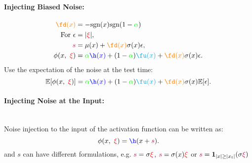 \documentclass[potrait,a0paper,fontscale=0.285,final]{baposter} %
\newcommand{\tpurple}[1]{\textcolor{purple}{#1}}
\newcommand{\tblue}[1]{\textcolor{blue}{#1}}
\newcommand{\tgreen}[1]{\textcolor{green}{#1}}
\newcommand{\torange}[1]{\textcolor{orange}{#1}}
\newcommand{\tcyan}[1]{\textcolor{cyan}{#1}}
\begin{document}
\begin{poster}
{\begin{minipage}[b]{0.92\textwidth}
	\begin{center}
		\centerline{}
	\end{center}
    \vspace*{-4mm}
\end{minipage}


\paragraph{Injecting Biased Noise:}
\begin{align*}
\torange{\fd(x)}&=-\text{sgn}(x)\text{sgn}(1-\tgreen{\alpha})\\
\text{For}~\epsilon&=|\tred{\xi}|, \\
    \tpurple{s}&=\mu(x) + \torange{\fd(x)} \sigma(x) \epsilon, \\
    \phi(x,~\tred{\xi})&=\tgreen{\alpha}\tblue{\h(x)} + (1-\tgreen{\alpha})\tcyan{\fu(x)} +
    \torange{\fd(x)}\sigma(x)\epsilon.
\end{align*}
Use the expectation of the noise at the test time:
\begin{equation*}
\E[\phi(x,~\tred{\xi})]=\tgreen{\alpha}\tblue{\h(x)} + (1-\tgreen{\alpha})\tcyan{\fu(x)} +
    \torange{\fd(x)}\sigma(x)\E[\epsilon].
\end{equation*}


\paragraph{Injecting Noise at the Input:}\mbox{}\\
Noise injection to the input of the activation function can be written as:\\
\begin{equation*}
\phi(x,~\tred{\xi}) = \tblue{\h}(x + \tpurple{s}).
\end{equation*}
and $s$ can have different formulations, e.g. $\tpurple{s}=\sigma\tred{\xi}$,
    $\tpurple{s}=\sigma(x)\tred{\xi}$ or
$\tpurple{s}=\mathbf{1}_{|x| \ge |x_t|}(\sigma\tpurple{\xi})$
}

\end{poster}
\end{document}
